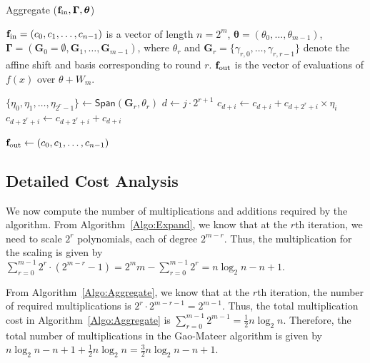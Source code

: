 \begin{algorithm}[htb]
	\caption{\textsf{Aggregate} (${\bf{f}}_\text{in}, \boldsymbol{\Gamma}, \boldsymbol{\theta}$)}
	\label{Algo:Aggregate}
	\begin{algorithmic}[1]
		\Require ${\bf{f}}_\text{in} = (c_0,c_1,\ldots,c_{n-1})$ is a vector of length $ n = 2^m$, 
		$\boldsymbol{\theta} = (\theta_0, \ldots, \theta_{m-1})$, 
		$\boldsymbol{\Gamma} = (\mathbf{G}_0 = \emptyset, \mathbf{G}_1, \ldots, \mathbf{G}_{m-1})$, 
		where $\theta_r$ and $\mathbf{G}_r = \{\gamma_{r,0},\ldots, \gamma_{r,r-1}\}$ denote the affine shift and basis corresponding to round $r$.
		\Ensure ${\bf{f}}_\text{out}$ is the vector of evaluations of $f(x)$ over $\theta + W_m$.
		
		\State $\{\eta_0, \eta_1, \ldots, \eta_{2^{r}-1} \} \gets \mathsf{Span}(\mathbf{G}_r, \theta_r)$
		\State $d \gets j \cdot 2^{r+1}$
		\State $c_{d+i} \gets c_{d+i} + c_{d+2^r+i} \times \eta_i$ \label{Step:AlgAgreeM1}
		\State $c_{d+2^r+i} \gets c_{d+2^r+i} + c_{d+i}$ \label{Step:AlgAgreeM2}
		\EndFor
		\EndFor
		\EndFor
		
		\State \Return ${\bf{f}}_\text{out} \gets (c_0,c_1,\ldots,c_{n-1})$
	\end{algorithmic}
\end{algorithm}



\subsection{Detailed Cost Analysis}\label{Sec:Cost-GM}
We now compute the number of multiplications and additions required by the algorithm. From Algorithm~\ref{Algo:Expand}, we know that at the $r$th iteration, we need to scale $2^r$ polynomials, each of degree $2^{m-r}$. Thus, the multiplication for the scaling is given by
$\sum_{r=0}^{m-1} 2^r \cdot (2^{m-r}-1)= 2^m m - \sum_{r=0}^{m-1} 2^r= n \log_2 n -n +1$.

From Algorithm~\ref{Algo:Aggregate}, we know that at the $r$th iteration, the number of required multiplications is $2^r \cdot 2^{m-r-1}=2^{m-1}$. Thus, the total multiplication cost in Algorithm~\ref{Algo:Aggregate} is $\sum_{r=0}^{m-1} 2^{m-1}=\frac{1}{2} n \log_2 n.$ Therefore, the total number of multiplications in the Gao-Mateer algorithm is given by $n \log_2 n -n +1 + \frac{1}{2} n \log_2 n = \frac{3}{2} n \log_2 n -n +1$.

